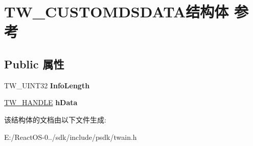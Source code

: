 \hypertarget{struct_t_w___c_u_s_t_o_m_d_s_d_a_t_a}{}\section{T\+W\+\_\+\+C\+U\+S\+T\+O\+M\+D\+S\+D\+A\+T\+A结构体 参考}
\label{struct_t_w___c_u_s_t_o_m_d_s_d_a_t_a}
\subsection*{Public 属性}
\begin{DoxyCompactItemize}
\item 
\mbox{\label{struct_t_w___c_u_s_t_o_m_d_s_d_a_t_a_a375111f0411b865ad82988f1a66493d3}} 
T\+W\+\_\+\+U\+I\+N\+T32 {\bfseries Info\+Length}
\item 
\mbox{\label{struct_t_w___c_u_s_t_o_m_d_s_d_a_t_a_a58efc1fb44caf3bdd14841b01ade744a}} 
\hyperlink{interfacevoid}{T\+W\+\_\+\+H\+A\+N\+D\+LE} {\bfseries h\+Data}
\end{DoxyCompactItemize}


该结构体的文档由以下文件生成\+:\begin{DoxyCompactItemize}
\item 
E\+:/\+React\+O\+S-\/0../sdk/include/psdk/twain.\+h\end{DoxyCompactItemize}
